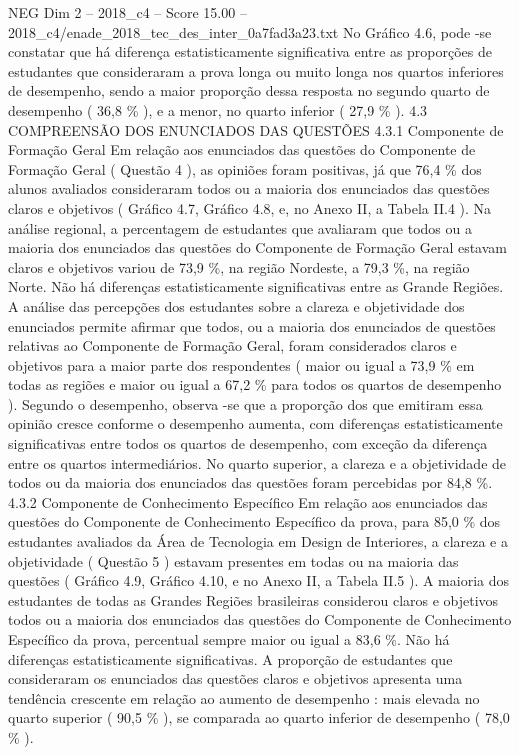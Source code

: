 \begin{textsample}{NEG Dim 2 – 2018\_c4 – Score 15.00 – 2018\_c4/enade\_2018\_tec\_des\_inter\_0a7fad3a23.txt}
No Gráfico 4.6, pode -se constatar que há diferença estatisticamente significativa entre as proporções de estudantes que consideraram a prova longa ou muito longa nos quartos inferiores de desempenho, sendo a maior proporção dessa resposta no segundo quarto de desempenho ( 36,8 \% ), e a menor, no quarto inferior ( 27,9 \% ). 4.3 COMPREENSÃO DOS ENUNCIADOS DAS QUESTÕES 4.3.1 Componente de Formação Geral Em relação aos enunciados das questões do Componente de Formação Geral ( Questão 4 ), as opiniões foram positivas, já que 76,4 \% dos alunos avaliados consideraram todos ou a maioria dos enunciados das questões claros e objetivos ( Gráfico 4.7, Gráfico 4.8, e, no Anexo II, a Tabela II.4 ).
Na análise regional, a percentagem de estudantes que avaliaram que todos ou a maioria dos enunciados das questões do Componente de Formação Geral estavam claros e objetivos variou de 73,9 \%, na região Nordeste, a 79,3 \%, na região Norte.
Não há diferenças estatisticamente significativas entre as Grande Regiões.
A análise das percepções dos estudantes sobre a clareza e objetividade dos enunciados permite afirmar que todos, ou a maioria dos enunciados de questões relativas ao Componente de Formação Geral, foram considerados claros e objetivos para a maior parte dos respondentes ( maior ou igual a 73,9 \% em todas as regiões e maior ou igual a 67,2 \% para todos os quartos de desempenho ).
Segundo o desempenho, observa -se que a proporção dos que emitiram essa opinião cresce conforme o desempenho aumenta, com diferenças estatisticamente significativas entre todos os quartos de desempenho, com exceção da diferença entre os quartos intermediários.
No quarto superior, a clareza e a objetividade de todos ou da maioria dos enunciados das questões foram percebidas por 84,8 \%. 4.3.2 Componente de Conhecimento Específico Em relação aos enunciados das questões do Componente de Conhecimento Específico da prova, para 85,0 \% dos estudantes avaliados da Área de Tecnologia em Design de Interiores, a clareza e a objetividade ( Questão 5 ) estavam presentes em todas ou na maioria das questões ( Gráfico 4.9, Gráfico 4.10, e no Anexo II, a Tabela II.5 ).
A maioria dos estudantes de todas as Grandes Regiões brasileiras considerou claros e objetivos todos ou a maioria dos enunciados das questões do Componente de Conhecimento Específico da prova, percentual sempre maior ou igual a 83,6 \%.
Não há diferenças estatisticamente significativas.
A proporção de estudantes que consideraram os enunciados das questões claros e objetivos apresenta uma tendência crescente em relação ao aumento de desempenho : mais elevada no quarto superior ( 90,5 \% ), se comparada ao quarto inferior de desempenho ( 78,0 \% ).

\end{textsample}

